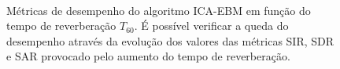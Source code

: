 \begin{figure}
    \centering
    \\
    \caption{Métricas de desempenho do algoritmo ICA-EBM em função do tempo de reverberação $T_{60}$. É possível verificar a queda do desempenho através da evolução dos valores das métricas SIR, SDR e SAR provocado pelo aumento do tempo de reverberação.}
    \label{fig:icaebmreverb}
\end{figure}

